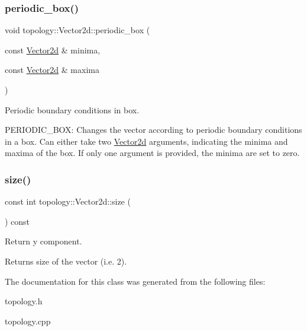 \subsubsection{\texorpdfstring{periodic\+\_\+box()}{periodic\_box()}}
{\footnotesize\ttfamily void topology\+::\+Vector2d\+::periodic\+\_\+box (\begin{DoxyParamCaption}\item[{const \mbox{\hyperlink{classtopology_1_1Vector2d}{Vector2d}} \&}]{minima,  }\item[{const \mbox{\hyperlink{classtopology_1_1Vector2d}{Vector2d}} \&}]{maxima }\end{DoxyParamCaption})}



Periodic boundary conditions in box. 

P\+E\+R\+I\+O\+D\+I\+C\+\_\+\+B\+OX\+: Changes the vector according to periodic boundary conditions in a box. Can either take two \mbox{\hyperlink{classtopology_1_1Vector2d}{Vector2d}} arguments, indicating the minima and maxima of the box. If only one argument is provided, the minima are set to zero. \mbox{\label{classtopology_1_1Vector2d_a81f9259cef101add1652394d8aea044c}} 
\subsubsection{\texorpdfstring{size()}{size()}}
{\footnotesize\ttfamily const int topology\+::\+Vector2d\+::size (\begin{DoxyParamCaption}{ }\end{DoxyParamCaption}) const\hspace{0.3cm}{\ttfamily [inline]}}



Return y component. 

Returns size of the vector (i.\+e. 2). 

The documentation for this class was generated from the following files\+:\begin{DoxyCompactItemize}
\item 
topology.\+h\item 
topology.\+cpp\end{DoxyCompactItemize}
